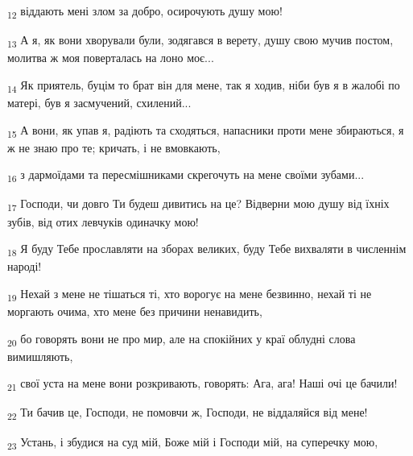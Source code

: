 \begin{tcolorbox}
\textsubscript{12} віддають мені злом за добро, осирочують душу мою!
\end{tcolorbox}
\begin{tcolorbox}
\textsubscript{13} А я, як вони хворували були, зодягався в верету, душу свою мучив постом, молитва ж моя поверталась на лоно моє...
\end{tcolorbox}
\begin{tcolorbox}
\textsubscript{14} Як приятель, буцім то брат він для мене, так я ходив, ніби був я в жалобі по матері, був я засмучений, схилений...
\end{tcolorbox}
\begin{tcolorbox}
\textsubscript{15} А вони, як упав я, радіють та сходяться, напасники проти мене збираються, я ж не знаю про те; кричать, і не вмовкають,
\end{tcolorbox}
\begin{tcolorbox}
\textsubscript{16} з дармоїдами та пересмішниками скрегочуть на мене своїми зубами...
\end{tcolorbox}
\begin{tcolorbox}
\textsubscript{17} Господи, чи довго Ти будеш дивитись на це? Відверни мою душу від їхніх зубів, від отих левчуків одиначку мою!
\end{tcolorbox}
\begin{tcolorbox}
\textsubscript{18} Я буду Тебе прославляти на зборах великих, буду Тебе вихваляти в численнім народі!
\end{tcolorbox}
\begin{tcolorbox}
\textsubscript{19} Нехай з мене не тішаться ті, хто ворогує на мене безвинно, нехай ті не моргають очима, хто мене без причини ненавидить,
\end{tcolorbox}
\begin{tcolorbox}
\textsubscript{20} бо говорять вони не про мир, але на спокійних у краї облудні слова вимишляють,
\end{tcolorbox}
\begin{tcolorbox}
\textsubscript{21} свої уста на мене вони розкривають, говорять: Ага, ага! Наші очі це бачили!
\end{tcolorbox}
\begin{tcolorbox}
\textsubscript{22} Ти бачив це, Господи, не помовчи ж, Господи, не віддаляйся від мене!
\end{tcolorbox}
\begin{tcolorbox}
\textsubscript{23} Устань, і збудися на суд мій, Боже мій і Господи мій, на суперечку мою,
\end{tcolorbox}
